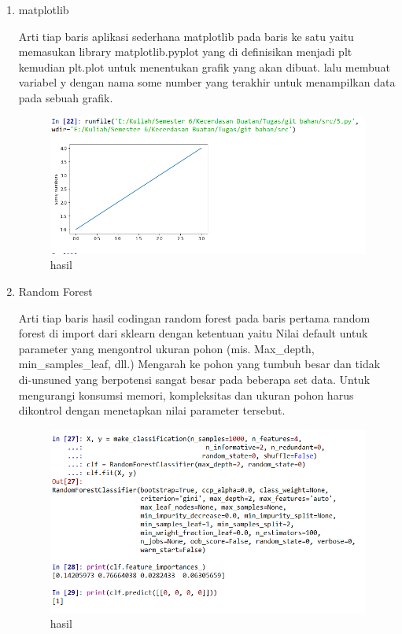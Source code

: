 \begin{enumerate}
\item matplotlib\par
Arti tiap baris aplikasi sederhana matplotlib pada baris ke satu yaitu memasukan library matplotlib.pyplot yang di definisikan menjadi plt kemudian plt.plot untuk menentukan grafik yang akan dibuat. lalu membuat variabel y dengan nama some number yang terakhir untuk menampilkan data pada sebuah grafik.

\begin{figure}[ht]
\centering
\includegraphics[scale=0.5]{figures/1174031/3/5.PNG}
\caption{hasil}
\label{contoh}
\end{figure}

\item Random Forest\par
Arti tiap baris hasil codingan random forest pada baris pertama random forest di import dari sklearn dengan ketentuan yaitu Nilai default untuk parameter yang mengontrol ukuran pohon (mis. Max\_depth, min\_samples\_leaf, dll.) Mengarah ke pohon yang tumbuh besar dan tidak di-unsuned yang berpotensi sangat besar pada beberapa set data. Untuk mengurangi konsumsi memori, kompleksitas dan ukuran pohon harus dikontrol dengan menetapkan nilai parameter tersebut.

\begin{figure}[ht]
\centering
\includegraphics[scale=0.5]{figures/1174031/3/7.PNG}
\caption{hasil}
\label{contoh}
\end{figure}


\end{enumerate}
